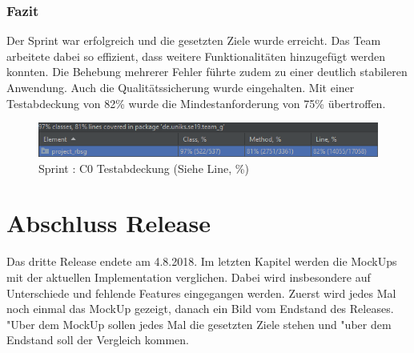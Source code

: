 \documentclass[12pt, titlepage]{scrartcl}
\newcommand{\RN}[1]{%
	\textup{\uppercase\expandafter{\romannumeral#1}}%
}
\begin{document}
	    	\subsubsection{Fazit}
	    		Der Sprint \RN{6} war erfolgreich und die gesetzten Ziele wurde erreicht. Das Team arbeitete dabei so effizient, dass weitere Funktionalit\"aten hinzugef\"ugt werden konnten. Die Behebung mehrerer Fehler f\"uhrte zudem zu einer deutlich stabileren Anwendung. Auch die Qualit\"atssicherung wurde eingehalten. Mit einer Testabdeckung von 82\% wurde die Mindestanforderung von 75\% \"ubertroffen.
	    		\begin{figure}[H] 
	    			\centering
	    			\includegraphics[width=\textwidth]{images/sprintVI/coverage.png}
	    			\caption{Sprint \RN{6}: C0 Testabdeckung (Siehe Line, \%)}
	    			\label{Coverage_6}
	    		\end{figure} 
	\newpage
	\section{Abschluss Release \RN{3}}
		Das dritte Release endete am 4.8.2018. Im letzten Kapitel werden die MockUps mit der aktuellen Implementation verglichen. Dabei wird insbesondere auf Unterschiede und fehlende Features eingegangen werden. Zuerst wird jedes Mal noch einmal das MockUp gezeigt, danach ein Bild vom Endstand des Releases. "Uber dem MockUp sollen jedes Mal die gesetzten Ziele stehen und "uber dem Endstand soll der Vergleich kommen.
\end{document}
